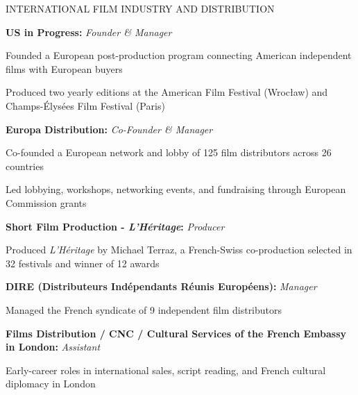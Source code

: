 \begin{rubric}{INTERNATIONAL FILM INDUSTRY AND DISTRIBUTION}

  \entry*[2012-2016]%
  \textbf{US in Progress:} \textit{Founder \& Manager}
  \par
  \begin{cvitems}
    \item Founded a European post-production program connecting American independent films
      with European buyers
    \item Produced two yearly editions at the American Film Festival (Wroc\l{}aw) and
      Champs-\'Elys\'ees Film Festival (Paris)
  \end{cvitems}

  \entry*[2006-2013]%
  \textbf{Europa Distribution:} \textit{Co-Founder \& Manager}
  \par
  \begin{cvitems}
    \item Co-founded a European network and lobby of 125 film distributors across 26 countries
    \item Led lobbying, workshops, networking events, and fundraising through European Commission
      grants
  \end{cvitems}

  \entry*[2011-2012]%
  \textbf{Short Film Production - \textit{L'H\'eritage}:} \textit{Producer}
  \par
  \begin{cvitems}
    \item Produced \textit{L'H\'eritage} by Michael Terraz, a French-Swiss co-production selected
      in 32 festivals and winner of 12 awards
  \end{cvitems}

  \entry*[2005-2007]%
  \textbf{DIRE (Distributeurs Ind\'ependants R\'eunis Europ\'eens):} \textit{Manager}
  \par
  \begin{cvitems}
    \item Managed the French syndicate of 9 independent film distributors
  \end{cvitems}

  \entry*[2003-2005]%
  \textbf{Films Distribution / CNC / Cultural Services of the French Embassy in London:} \textit{Assistant}
  \par
  \begin{cvitems}
    \item Early-career roles in international sales, script reading, and French cultural
      diplomacy in London
  \end{cvitems}

\end{rubric}
